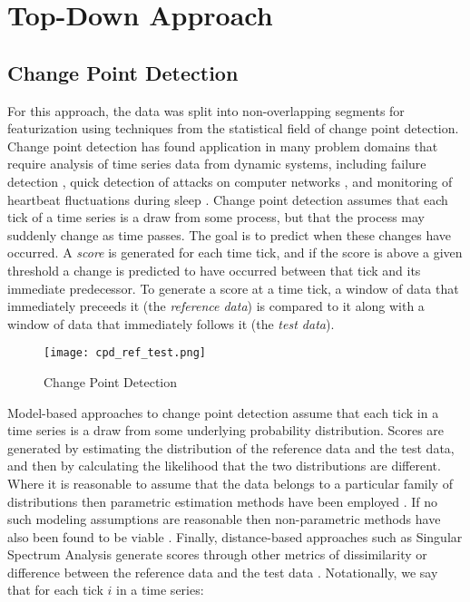 \section{Top-Down Approach}
\label{sec:topdown}

\subsection{Change Point Detection}
For this approach, the data was split into non-overlapping segments for
featurization using techniques from the statistical field of change point detection.
Change point detection has found application in many problem domains that require analysis of time series data
from dynamic systems, including failure detection \cite{bae13}, quick detection of
attacks on computer networks \cite{tartakovsky06}, and monitoring of heartbeat fluctuations during
sleep \cite{staudacher05}. Change point detection assumes that each tick of a time series is a draw from some
process, but that the process may suddenly change as time passes.
The goal is to predict when these changes have occurred.
A \emph{score} is generated for each time tick, and if the score is
above a given threshold a change is predicted to have occurred between that tick
and its immediate predecessor. To generate a score at
a time tick, a window of data that immediately preceeds it (the
\emph{reference data}) is compared to it along with a window of data that immediately follows it
(the \emph{test data}).

\begin{figure}
 \centering
 \texttt{[image: cpd\_ref\_test.png]}
 \caption{Change Point Detection}
 \label{fig:cpd_ref_test.png}
\end{figure}

Model-based approaches to change point detection assume that each tick in
a time series is a draw from some underlying probability distribution.
Scores are generated by estimating the distribution of the reference data
and the test data, and then by calculating the likelihood
that the two distributions are different.
Where it is reasonable to assume that the data belongs to a particular
family of distributions then parametric estimation methods have been employed
\cite{thatte11}. If no such modeling assumptions are reasonable then 
non-parametric methods have also been found to be viable \cite{matteson12}.
Finally, distance-based approaches such as Singular Spectrum Analysis
generate scores through other metrics of 
dissimilarity or difference between the reference data and the test data
\cite{moskvina03}.
Notationally, we say that for each tick $i$ in a time series:

